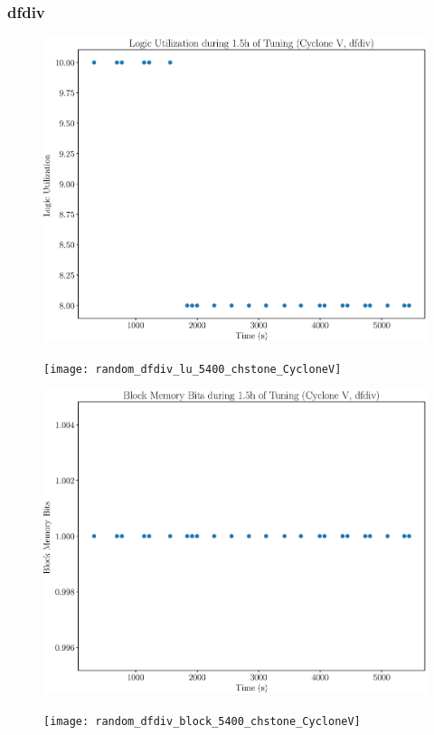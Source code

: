 \documentclass[12pt, a4paper]{article}
\begin{document}
\newpage

\subsubsection{dfdiv}

\begin{figure}[htpb]
    \centering
    \noindent
    \begin{minipage}{.48\textwidth}
        \centering
        \includegraphics[scale=.25]{dfdiv_lu_5400_chstone_CycloneV}
    \end{minipage}%
    \hfill
    \begin{minipage}{.48\textwidth}
        \centering
        \texttt{[image: random\_dfdiv\_lu\_5400\_chstone\_CycloneV]}
    \end{minipage}%

    \begin{minipage}{.48\textwidth}
        \includegraphics[scale=.25]{dfdiv_block_5400_chstone_CycloneV}
    \end{minipage}%
    \hfill
    \begin{minipage}{.48\textwidth}
        \texttt{[image: random\_dfdiv\_block\_5400\_chstone\_CycloneV]}
    \end{minipage}%


\end{figure}
\end{document}
